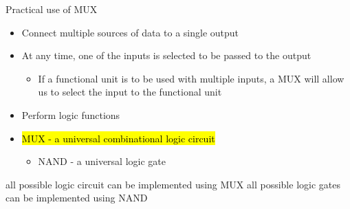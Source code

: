 \begin{frame}{Practical use of MUX}
    \begin{tcolorbox}[enhanced,attach boxed title to top center={yshift=-3mm,yshifttext=-1mm},
  colback=blue!5!white,colframe=blue!75!black,colbacktitle=blue!80!black,
  title=Think About It,fonttitle=\bfseries,
  boxed title style={size=small,colframe=red!50!black} ]
  \begin{itemize}
    \item Connect multiple sources of data to a single output
    \item At any time, one of the inputs is selected to be passed to the output
    \begin{itemize}
        \item If a functional unit is to be used with multiple inputs, a MUX will allow us to select the input to the functional unit
    \end{itemize}
    \item Perform logic functions
    \item \hl{MUX - a universal combinational logic circuit}
    \begin{itemize}
        \item NAND - a universal logic gate
    \end{itemize}
  \end{itemize}
\end{tcolorbox}

\BNotes\ifnum{}
all possible logic circuit can be implemented using MUX
all possible logic gates can be implemented using NAND
\fi
\end{frame}

  
